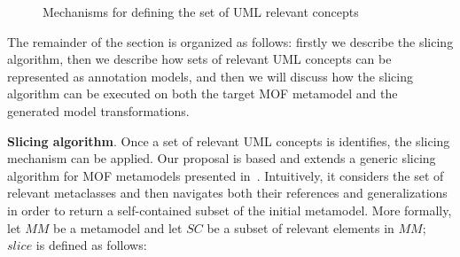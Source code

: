 \begin{figure}
	\hspace{2mm}
  \caption{Mechanisms for defining the set of UML relevant concepts}
  \label{fig:slicingIdea}
\end{figure}
%

The remainder of the section is organized as follows: firstly we describe the slicing algorithm, then we describe how sets of relevant UML concepts can be represented as annotation models, and then we will discuss how the slicing algorithm can be executed on both the target MOF metamodel and the generated model transformations.

\textbf{Slicing algorithm}. Once a set of relevant UML concepts is identifies, the slicing mechanism can be applied. Our proposal
is based and extends a generic slicing algorithm for MOF metamodels presented in~\cite{ICSEbyadl}. Intuitively,
it considers the set of relevant metaclasses and then navigates both their references and generalizations in order
to return a self-contained subset of the initial metamodel.
More formally, let $MM$ be a metamodel and let $SC$ be a subset of relevant elements in
$MM$; $slice$ is defined as follows:

